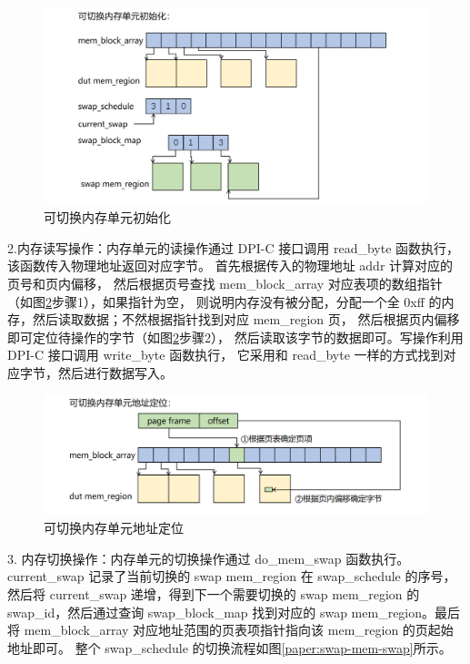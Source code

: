 \begin{figure}[!h]
    \centering
    \includegraphics[width=\linewidth]{figure/paper/swap-mem-init.png}
    \caption{可切换内存单元初始化}
    \label{paper:swap-mem-init}
\end{figure}

2.内存读写操作：内存单元的读操作通过 DPI-C 接口调用 read\_byte 函数执行，该函数传入物理地址返回对应字节。
首先根据传入的物理地址 addr 计算对应的页号和页内偏移，
然后根据页号查找 mem\_block\_array 对应表项的数组指针（如图\ref{paper:swap-mem-addr}步骤1），如果指针为空，
则说明内存没有被分配，分配一个全 0xff 的内存，然后读取数据；不然根据指针找到对应 mem\_region 页，
然后根据页内偏移即可定位待操作的字节（如图\ref{paper:swap-mem-addr}步骤2），
然后读取该字节的数据即可。写操作利用 DPI-C 接口调用 write\_byte 函数执行，
它采用和 read\_byte 一样的方式找到对应字节，然后进行数据写入。\par

\begin{figure}[!h]
    \centering
    \includegraphics[width=\linewidth]{figure/paper/swap-mem-addr.png}
    \caption{可切换内存单元地址定位}
    \label{paper:swap-mem-addr}
\end{figure}

3. 内存切换操作：内存单元的切换操作通过 do\_mem\_swap 函数执行。current\_swap 记录了当前切换的 swap mem\_region 在
swap\_schedule 的序号，然后将 current\_swap 递增，得到下一个需要切换的 swap mem\_region 的 swap\_id，然后通过查询 swap\_block\_map 
找到对应的 swap mem\_region。最后将 mem\_block\_array 对应地址范围的页表项指针指向该 mem\_region 的页起始地址即可。
整个 swap\_schedule 的切换流程如图\ref{paper:swap-mem-swap}所示。\par

